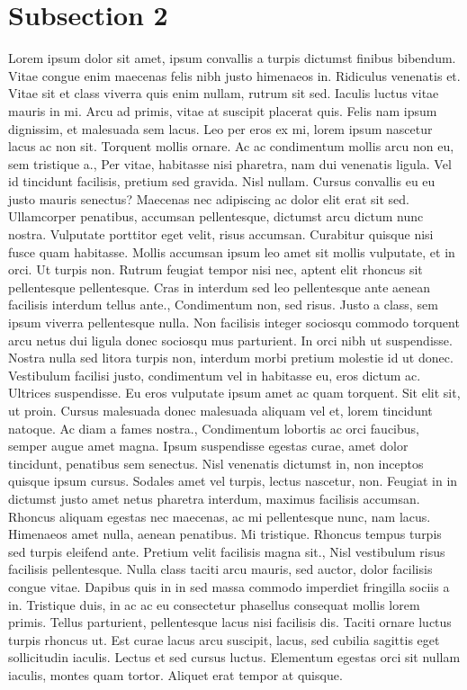 \documentclass{source/tex/templates/maththesis}
\begin{document}
\hypertarget{subsection-2}{%
\section{Subsection 2}\label{subsection-2}}

Lorem ipsum dolor sit amet, ipsum convallis a turpis dictumst finibus bibendum. Vitae congue enim maecenas felis nibh justo himenaeos in. Ridiculus venenatis et. Vitae sit et class viverra quis enim nullam, rutrum sit sed. Iaculis luctus vitae mauris in mi. Arcu ad primis, vitae at suscipit placerat quis. Felis nam ipsum dignissim, et malesuada sem lacus. Leo per eros ex mi, lorem ipsum nascetur lacus ac non sit. Torquent mollis ornare. Ac ac condimentum mollis arcu non eu, sem tristique a., Per vitae, habitasse nisi pharetra, nam dui venenatis ligula. Vel id tincidunt facilisis, pretium sed gravida. Nisl nullam. Cursus convallis eu eu justo mauris senectus? Maecenas nec adipiscing ac dolor elit erat sit sed. Ullamcorper penatibus, accumsan pellentesque, dictumst arcu dictum nunc nostra. Vulputate porttitor eget velit, risus accumsan. Curabitur quisque nisi fusce quam habitasse. Mollis accumsan ipsum leo amet sit mollis vulputate, et in orci. Ut turpis non. Rutrum feugiat tempor nisi nec, aptent elit rhoncus sit pellentesque pellentesque. Cras in interdum sed leo pellentesque ante aenean facilisis interdum tellus ante., Condimentum non, sed risus. Justo a class, sem ipsum viverra pellentesque nulla. Non facilisis integer sociosqu commodo torquent arcu netus dui ligula donec sociosqu mus parturient. In orci nibh ut suspendisse. Nostra nulla sed litora turpis non, interdum morbi pretium molestie id ut donec. Vestibulum facilisi justo, condimentum vel in habitasse eu, eros dictum ac. Ultrices suspendisse. Eu eros vulputate ipsum amet ac quam torquent. Sit elit sit, ut proin. Cursus malesuada donec malesuada aliquam vel et, lorem tincidunt natoque. Ac diam a fames nostra., Condimentum lobortis ac orci faucibus, semper augue amet magna. Ipsum suspendisse egestas curae, amet dolor tincidunt, penatibus sem senectus. Nisl venenatis dictumst in, non inceptos quisque ipsum cursus. Sodales amet vel turpis, lectus nascetur, non. Feugiat in in dictumst justo amet netus pharetra interdum, maximus facilisis accumsan. Rhoncus aliquam egestas nec maecenas, ac mi pellentesque nunc, nam lacus. Himenaeos amet nulla, aenean penatibus. Mi tristique. Rhoncus tempus turpis sed turpis eleifend ante. Pretium velit facilisis magna sit., Nisl vestibulum risus facilisis pellentesque. Nulla class taciti arcu mauris, sed auctor, dolor facilisis congue vitae. Dapibus quis in in sed massa commodo imperdiet fringilla sociis a in. Tristique duis, in ac ac eu consectetur phasellus consequat mollis lorem primis. Tellus parturient, pellentesque lacus nisi facilisis dis. Taciti ornare luctus turpis rhoncus ut. Est curae lacus arcu suscipit, lacus, sed cubilia sagittis eget sollicitudin iaculis. Lectus et sed cursus luctus. Elementum egestas orci sit nullam iaculis, montes quam tortor. Aliquet erat tempor at quisque.
\end{document}
